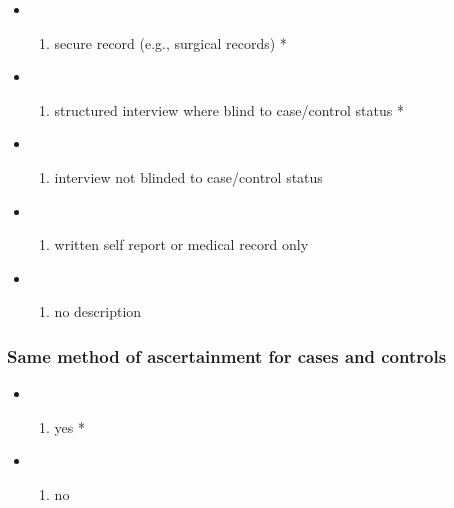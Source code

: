 \documentclass[
  doc, a4paper]{apa7}
\providecommand{\tightlist}{%
  \setlength{\itemsep}{0pt}\setlength{\parskip}{0pt}}
\begin{document}
\begin{itemize}
\tightlist
\item
  \begin{enumerate}
  \def\labelenumi{\alph{enumi})}
  \tightlist
  \item
    secure record (e.g., surgical records) *
  \end{enumerate}
\item
  \begin{enumerate}
  \def\labelenumi{\alph{enumi})}
  \setcounter{enumi}{1}
  \tightlist
  \item
    structured interview where blind to case/control status *
  \end{enumerate}
\item
  \begin{enumerate}
  \def\labelenumi{\alph{enumi})}
  \setcounter{enumi}{2}
  \tightlist
  \item
    interview not blinded to case/control status
  \end{enumerate}
\item
  \begin{enumerate}
  \def\labelenumi{\alph{enumi})}
  \setcounter{enumi}{3}
  \tightlist
  \item
    written self report or medical record only
  \end{enumerate}
\item
  \begin{enumerate}
  \def\labelenumi{\alph{enumi})}
  \setcounter{enumi}{4}
  \tightlist
  \item
    no description
  \end{enumerate}
\end{itemize}

\subsubsection{Same method of ascertainment for cases and controls}\label{same-method-of-ascertainment-for-cases-and-controls}

\begin{itemize}
\tightlist
\item
  \begin{enumerate}
  \def\labelenumi{\alph{enumi})}
  \tightlist
  \item
    yes *
  \end{enumerate}
\item
  \begin{enumerate}
  \def\labelenumi{\alph{enumi})}
  \setcounter{enumi}{1}
  \tightlist
  \item
    no
  \end{enumerate}
\end{itemize}
\end{document}
